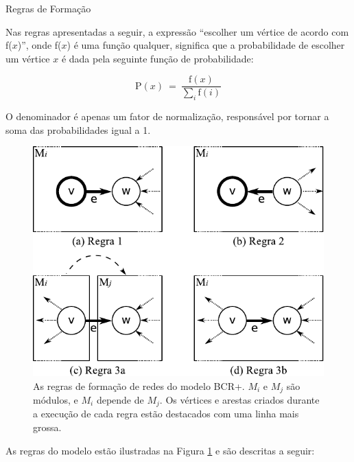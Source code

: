 \begin{section}{Regras de Formação}


Nas regras apresentadas a seguir, a expressão ``escolher um vértice de acordo com f($x$)'', onde f($x$) é uma função qualquer, significa que a probabilidade de escolher um vértice $x$ é dada pela seguinte função de probabilidade:

$$
  \mathrm{P}(x) ~=~ \frac{ \mathrm{f}(x) }
  { \displaystyle\sum_{i} \mathrm{f}(i) }
$$

O denominador é apenas um fator de normalização, responsável por tornar a soma das probabilidades igual a 1.

\begin{figure}[htbp]
	\centering
		\includegraphics[scale=1]{figuras/regras-bcr}
	\caption{As regras de formação de redes do modelo BCR+. $M_i$ e $M_j$ são módulos, e $M_i$ depende de $M_j$. Os vértices e arestas criados durante a execução de cada regra estão destacados com uma linha mais grossa.}
	\label{fig:bcr-regras}
\end{figure}

As regras do modelo estão ilustradas na Figura \ref{fig:bcr-regras} e são descritas a seguir:

\begin{enumerate}


\end{enumerate}
\end{section}
